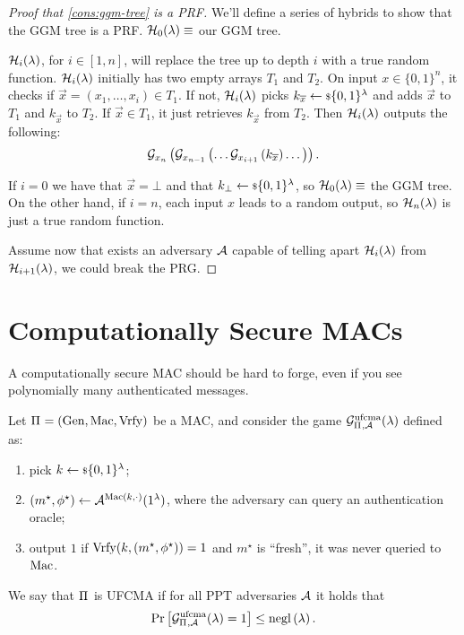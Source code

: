 \begin{proof}[Proof that \cref{cons:ggm-tree} is a \acs{PRF}]
	We'll define a series of hybrids to show that the \ac{GGM} tree is a \ac{PRF}.
	$\mathcal{H}_0(\lambda) \equiv$ our \ac{GGM} tree.

	$\mathcal{H}_i(\lambda)$, for $i \in [1, n]$, will replace the tree up to depth $i$ with a true random function.
	$\mathcal{H}_i(\lambda)$ initially has two empty arrays $T_1$ and $T_2$.
	On input $x \in \{0,1\}^{n}$, it checks if $\vec{x} = (x_1, \dots, x_i) \in T_1$.
	If not, $\mathcal{H}_i(\lambda)$ picks $k_{\overline{x}} \leftarrow {\scriptstyle \$} {\{0,1\}^{\lambda}}$ and adds $\vec{x}$ to $T_1$ and $k_{\vec{x}}$ to $T_2$.
	If $\vec{x} \in T_1$, it just retrieves $k_{\vec{x}}$ from $T_2$.
	Then $\mathcal{H}_i(\lambda)$ outputs the following:
	\begin{equation*}
		\mathcal{G}_{x_n} \left( \mathcal{G}_{x_{n-1}} \left( \dots \mathcal{G}_{x_{i+1}} \left( k_{\overline{x}} \right) \dots \right) \right).
	\end{equation*}

	If $i = 0$ we have that $\vec{x} = \bot$ and that $k_{\bot} \leftarrow {\scriptstyle \$} {\{0,1\}^{\lambda}}$, so $\mathcal{H}_{0}(\lambda) \equiv$ the \ac{GGM} tree.
	On the other hand, if $i = n$, each input $x$ leads to a random output, so $\mathcal{H}_{n}(\lambda)$ is just a true random function.

	Assume now that exists an adversary $\mathcal{A}$ capable of telling apart $\mathcal{H}_{i}(\lambda)$ from $\mathcal{H}_{i+1}(\lambda)$, we could break the \ac{PRG}.
\end{proof}

\section{Computationally Secure \acsp{MAC}}

A computationally secure \ac{MAC} should be hard to forge, even if you see polynomially many authenticated messages.

\begin{definition}
	Let $\Pi_{} = \left( \mathrm{Gen}, \allowbreak \mathrm{Mac}, \allowbreak \mathrm{Vrfy} \right)$ be a \ac{MAC}, and consider the game $\mathcal{G}^{\scriptstyle \text{ufcma}}_{\Pi_{},\mathcal{A}}(\lambda)$ defined as:
	\begin{enumerate}
		\item pick $k \leftarrow {\scriptstyle \$} {\{0,1\}^{\lambda}}$;
		\item $(m^{\star}, \phi^{\star}) \leftarrow \mathcal{A}^{\mathrm{Mac}(k, \cdot)}(1^{\lambda})$, where the adversary can query an authentication oracle;
		\item output $1$ if $\mathrm{Vrfy}(k, (m^{\star}, \phi^{\star})) = 1$ and $m^{\star}$ is ``fresh'', \ie it was never queried to $\mathrm{Mac}$.
	\end{enumerate}
	We say that $\Pi_{}$ is \ac{UFCMA} if for all \ac{PPT} adversaries $\mathcal{A}$ it holds that
	\begin{equation*}
		\mathop{\mathrm{Pr}}\limits_{} \left[ {\mathcal{G}^{\scriptstyle \text{ufcma}}_{\Pi_{},\mathcal{A}} (\lambda) = 1} \right] \le \mathrm{negl}\left({\lambda}\right).
	\end{equation*}
\end{definition}

